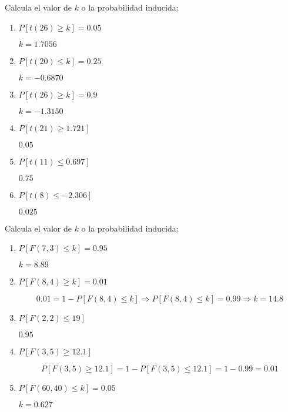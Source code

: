 \begin{ejercicio}
    Calcula el valor de $k$ o la probabilidad inducida:
    \begin{enumerate}[label=\alph*)]
        \item $P[t(26)\geq k] = 0.05$

            $k = 1.7056$
        \item $P[t(20)\leq k] = 0.25$

            $k = -0.6870$
        \item $P[t(26) \geq k] = 0.9$

            $k = -1.3150$
        \item $P[t(21) \geq 1.721]$

            $0.05$
        \item $P[t(11) \leq 0.697]$

            $0.75$
        \item $P[t(8) \leq -2.306]$

            $0.025$
    \end{enumerate}
\end{ejercicio}

\begin{ejercicio}
    Calcula el valor de $k$ o la probabilidad inducida:
    \begin{enumerate}[label=\alph*)]
        \item $P[F(7,3) \leq k] = 0.95$

            $k = 8.89$
        \item $P[F(8,4) \geq k] = 0.01$

            \begin{equation*}
                0.01 = 1 - P[F(8,4) \leq k] \Longrightarrow P[F(8,4) \leq k] = 0.99 \Longrightarrow k = 14.8
            \end{equation*}
        \item $P[F(2,2) \leq 19]$

            $0.95$
        \item $P[F(3,5) \geq 12.1]$

            \begin{equation*}
                P[F(3,5) \geq 12.1] = 1-P[F(3,5) \leq 12.1] = 1-0.99 = 0.01
            \end{equation*}
        \item $P[F(60,40) \leq k] = 0.05$

            $k = 0.627$
    \end{enumerate}
\end{ejercicio}
